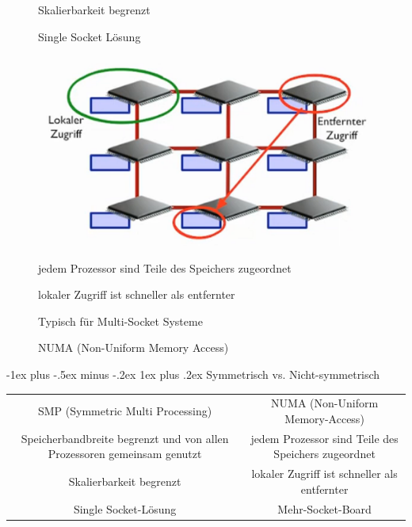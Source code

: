 \documentclass[10pt]{article}
\makeatletter
\renewcommand{\subsubsection}{\@startsection{subsubsection}{3}{0mm}%
                                {-1ex plus -.5ex minus -.2ex}%
                                {1ex plus .2ex}%
                                {\normalfont\small\bfseries}}
\makeatother
\begin{document}
\begin{figure}[!tbp]
\begin{minipage}[b]{0.45\textwidth}
\begin{itemize*}
      \item Skalierbarkeit begrenzt
      \item Single Socket Lösung
    \end{itemize*}
  \end{minipage}
  \hfill
  \begin{minipage}[b]{0.45\textwidth}
    \includegraphics[width=1.0\linewidth]{Assets/Programmierparadigmen-NUMA}
    \caption{NUMA (Non-Uniform Memory Access)}
    \begin{itemize*}
      \item jedem Prozessor sind Teile des Speichers zugeordnet
      \item lokaler Zugriff ist schneller als entfernter
      \item Typisch für Multi-Socket Systeme
    \end{itemize*}
  \end{minipage}
\end{figure}

\subsubsection{Symmetrisch vs. Nicht-symmetrisch}
\begin{tabular}{c | c}
  SMP (Symmetric Multi Processing)                                        & NUMA (Non-Uniform Memory-Access)                    \\
  Speicherbandbreite begrenzt und von allen Prozessoren gemeinsam genutzt & jedem Prozessor sind Teile des Speichers zugeordnet \\
  Skalierbarkeit begrenzt                                                 & lokaler Zugriff ist schneller als entfernter        \\
  Single Socket-Lösung                                                    & Mehr-Socket-Board                                   \\
\end{tabular}
\end{document}
